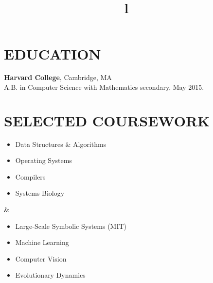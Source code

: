 \documentclass[centered, margin, 10pt]{res} %
\title{l}\\
\newenvironment{rlist}
    {\begin{minipage}[t]{\linewidth}\begin{itemize}\raggedright}
    {\end{itemize}\end{minipage}}
\begin{document}

\address{(address redacted)}


\begin{resume}


\section{EDUCATION}

{\bf Harvard College}, Cambridge, MA
\\
A.B. in Computer Science with Mathematics secondary, May 2015.


\section{SELECTED COURSEWORK}

\begin{ncolumn}{2}
  \begin{rlist}
    \item Data Structures \& Algorithms
    \item Operating Systems
    \item Compilers
    \item Systems Biology
  \end{rlist}
  &
  \begin{rlist}
    \item Large-Scale Symbolic Systems (MIT)
    \item Machine Learning
    \item Computer Vision
    \item Evolutionary Dynamics
  \end{rlist}
\end{ncolumn}


\end{resume}
\end{document}
